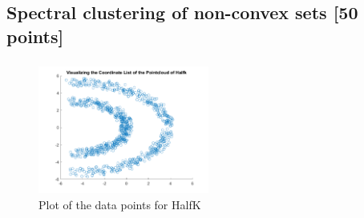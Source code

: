 \documentclass[unicode,11pt,a4paper,oneside,numbers=endperiod,openany]{scrartcl}
\begin{document}
\setassignment
{}

\newline

\assignmentpolicy


\newpage

\subsection{Spectral clustering of non-convex sets [50 points]}

\subsubsection{}

\begin{figure}[H]
    \centering
    \includegraphics[width=0.5\textwidth]{figures/1.1.png}
    \caption{Plot of the data points for HalfK}
    \label{fig:1.1}
\end{figure}
\end{document}
